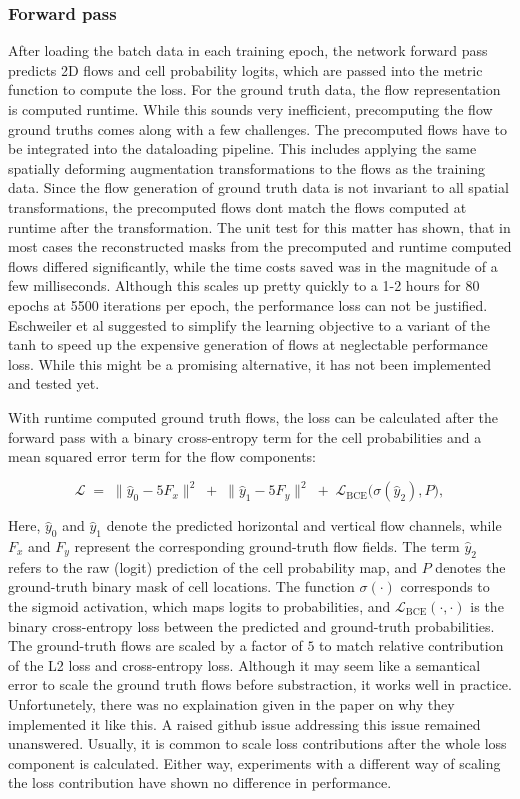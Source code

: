 \subsubsection{Forward pass}
After loading the batch data in each training epoch, the network forward pass predicts 2D flows and cell probability logits, which are passed into the metric function to compute the loss. For the ground truth data, the flow representation is computed runtime. While this sounds very inefficient, precomputing the flow ground truths comes along with a few challenges. The precomputed flows have to be integrated into the dataloading pipeline. This includes applying the same spatially deforming augmentation transformations to the flows as the training data. Since the flow generation of ground truth data is not invariant to all spatial transformations, the precomputed flows dont match the flows computed at runtime after the transformation. The unit test for this matter has shown, that in most cases the reconstructed masks from the precomputed and runtime computed flows differed significantly, while the time costs saved was in the magnitude of a few milliseconds. Although this scales up pretty quickly to a 1-2 hours for 80 epochs at 5500 iterations per epoch, the performance loss can not be justified. Eschweiler et al \cite{eschweiler} suggested to simplify the learning objective to a variant of the tanh to speed up the expensive generation of flows at neglectable performance loss. While this might be a promising alternative, it has not been implemented and tested yet.

With runtime computed ground truth flows, the loss can be calculated after the forward pass with a binary cross-entropy term for the cell probabilities and a mean squared error term for the flow components:

\begin{equation} 
\mathcal{L} \;=\; \| \hat{y}_0 - 5 F_x \|^2 \;+\; \| \hat{y}_1 - 5 F_y \|^2 
\;+\; \mathcal{L}_{\text{BCE}} \bigl(\sigma(\hat{y}_2), P \bigr),
\end{equation}

Here, $\hat{y}_0$ and $\hat{y}_1$ denote the predicted horizontal and vertical flow channels, while $F_x$ and $F_y$ represent the corresponding ground-truth flow fields. The term $\hat{y}_2$ refers to the raw (logit) prediction of the cell probability map, and $P$ denotes the ground-truth binary mask of cell locations. The function $\sigma(\cdot)$ corresponds to the sigmoid activation, which maps logits to probabilities, and $\mathcal{L}_{\text{BCE}}(\cdot,\cdot)$ is the binary cross-entropy loss between the predicted and ground-truth probabilities. The ground-truth flows are scaled by a factor of $5$ to match relative contribution of the L2 loss and cross-entropy loss. Although it may seem like a semantical error to scale the ground truth flows before substraction, it works well in practice. Unfortunetely, there was no explaination given in the paper on why they implemented it like this. A raised github issue addressing this issue remained unanswered. Usually, it is common to scale loss contributions after the whole loss component is calculated. Either way, experiments with a different way of scaling the loss contribution have shown no difference in performance. 


